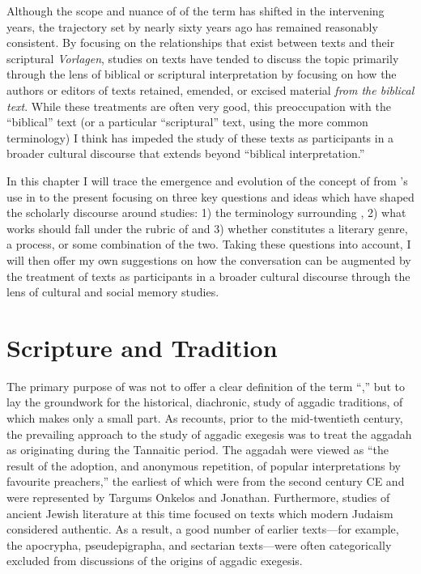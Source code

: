 Although the scope and nuance of of the term \rwB has shifted in the intervening years, the trajectory set by \vermes nearly sixty years ago has remained reasonably consistent. By focusing on the relationships that exist between \rwb texts and their scriptural \emph{Vorlagen}, studies on \rwb texts have tended to discuss the topic primarily through the lens of biblical or scriptural interpretation by focusing on how the authors or editors of \rwb texts retained, emended, or excised material \emph{from the biblical text}. While these treatments are often very good, this preoccupation with the ``biblical'' text (or a particular ``scriptural'' text, using the more common terminology) I think has impeded the study of these texts as participants in a broader cultural discourse that extends beyond ``biblical interpretation.''

In this chapter I will trace the emergence and evolution of the concept of \rwB from \vermes's use in  to the present focusing on three key questions and ideas which have shaped the scholarly discourse around \rwB studies: 1) the terminology surrounding \rwB, 2) what works should fall under the rubric of \rwB and 3) whether \rwB constitutes a literary genre, a process, or some combination of the two. Taking these questions into account, I will then offer my own suggestions on how the \rwb conversation can be augmented by the treatment of \rwb texts as participants in a broader cultural discourse through the lens of cultural and social memory studies.

\section{Scripture and Tradition}

The primary purpose of  was not to offer a clear definition of the term ``\rwB,'' but to lay the groundwork for the historical, diachronic, study of aggadic traditions, of which \rwB makes only a small part.%
    \autocite[3]{vermes_zsengeller2014}
As \vermes recounts, prior to the mid-twentieth century, the prevailing approach to the study of aggadic exegesis was to treat the aggadah as originating during the Tannaitic period. The aggadah were viewed as ``the result of the adoption, and anonymous repetition, of popular interpretations by favourite preachers,''%
    \autocite[3]{vermes1961}
the earliest of which were from the second century CE and were represented by Targums Onkelos and Jonathan. Furthermore, studies of ancient Jewish literature at this time focused on texts which modern Judaism considered authentic. As a result, a good number of earlier texts---for example, the apocrypha, pseudepigrapha, and sectarian texts---were often categorically excluded from discussions of the origins of aggadic exegesis.%
    \autocite[2]{vermes1961} 

